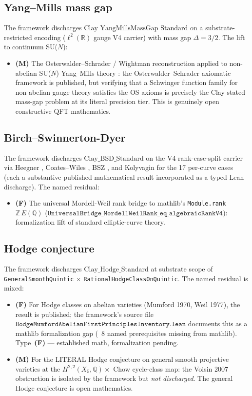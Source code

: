 \documentclass[11pt,a4paper,reqno]{amsart}
\theoremstyle{plain}
\theoremstyle{definition}
\theoremstyle{remark}
\newcommand{\Cstd}[1]{\mathrm{Clay\_#1\_Standard}}
\newcommand{\code}[1]{\texttt{#1}}
\begin{document}
\subsection{Yang--Mills mass gap}
The framework discharges $\Cstd{YangMillsMassGap}$ on a
substrate-restricted encoding ($\ell^{2}(\mathbb{R})$ gauge V4 carrier)
with mass gap $\Delta = 3/2$. The lift to continuum SU($N$):
\begin{itemize}
\item \textbf{(M)} The Osterwalder--Schrader / Wightman reconstruction
  applied to non-abelian SU($N$) Yang--Mills theory
  \cite{wightman1956, osterwalder1973}: the Osterwalder--Schrader
  axiomatic framework is published, but verifying that a Schwinger
  function family for non-abelian gauge theory satisfies the OS axioms
  is precisely the Clay-stated mass-gap problem at its literal
  precision tier. This is genuinely open constructive QFT mathematics.
\end{itemize}

\subsection{Birch--Swinnerton-Dyer}
The framework discharges $\Cstd{BSD}$ on the V4 rank-case-split
carrier via Heegner \cite{heegner1952}, Coates--Wiles
\cite{coates1977kummer}, BSZ \cite{birch1965notes,
swinnerton1965conjectures}, and Kolyvagin \cite{kolyvagin1988} for the
17 per-curve cases (each a substantive published mathematical result
incorporated as a typed Lean discharge). The named residual:
\begin{itemize}
\item \textbf{(F)} The universal Mordell-Weil rank bridge to mathlib's
  \code{Module.rank} $\mathbb{Z}\, E(\mathbb{Q})$
  ($\code{UniversalBridge\_MordellWeilRank\_eq\_algebraicRankV4}$):
  formalization lift of standard elliptic-curve theory.
\end{itemize}

\subsection{Hodge conjecture}
The framework discharges $\Cstd{Hodge}$ at substrate scope of
\code{GeneralSmoothQuintic} $\times$ \code{RationalHodgeClassOnQuintic}.
The named residual is mixed:
\begin{itemize}
\item \textbf{(F)} For Hodge classes on abelian varieties (Mumford 1970,
  Weil 1977), the result is published; the framework's source file
  $\code{HodgeMumfordAbelianFirstPrinciplesInventory.lean}$ documents
  this as a mathlib formalization gap (~$8$ named prerequisites
  missing from mathlib). Type~\textbf{(F)} — established math,
  formalization pending.
\item \textbf{(M)} For the LITERAL Hodge conjecture on general smooth
  projective varieties at the $H^{2,2}(X_{5}, \mathbb{Q}) \times$ Chow
  cycle-class map: the Voisin 2007 \cite{voisin2007hodge} obstruction
  is isolated by the framework but \emph{not discharged}. The general
  Hodge conjecture is open mathematics.
\end{itemize}
\end{document}
